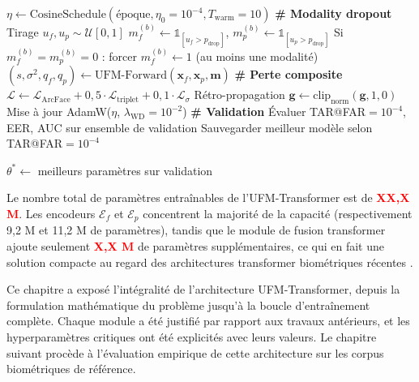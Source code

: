 \documentclass[12pt,a4paper]{report}
\newcommand{\TO}{\textbf{to}}
\begin{document}
\begin{algorithm}[htbp]
\begin{algorithmic}[1]
\FOR{$\text{\'{e}poque} = 1$ \TO $100$}
    \STATE $\eta \leftarrow \text{CosineSchedule}(\text{\'{e}poque}, \eta_0 = 10^{-4}, T_{\text{warm}} = 10)$
        \STATE \textbf{\# Modality dropout}
        \FOR{$b = 1$ \TO $B$}
            \STATE Tirage $u_f, u_p \sim \mathcal{U}[0,1]$
            \STATE $m_f^{(b)} \leftarrow \mathbb{1}_{[u_f > p_{\text{drop}}]}$, $m_p^{(b)} \leftarrow \mathbb{1}_{[u_p > p_{\text{drop}}]}$
            \STATE Si $m_f^{(b)} = m_p^{(b)} = 0$ : forcer $m_f^{(b)} \leftarrow 1$ (au moins une modalit\'{e})
        \ENDFOR
        \STATE $(s, \sigma^2, q_f, q_p) \leftarrow \text{UFM-Forward}(\mathbf{x}_f, \mathbf{x}_p, \mathbf{m})$
        \STATE \textbf{\# Perte composite}
        \STATE $\mathcal{L} \leftarrow \mathcal{L}_{\text{ArcFace}} + 0{,}5 \cdot \mathcal{L}_{\text{triplet}} + 0{,}1 \cdot \mathcal{L}_{\sigma}$
        \STATE R\'{e}tro-propagation
        \STATE $\mathbf{g} \leftarrow \text{clip}_{\text{norm}}(\mathbf{g}, 1{,}0)$
        \STATE Mise \`{a} jour AdamW($\eta$, $\lambda_{\text{WD}} = 10^{-2}$)
    \ENDFOR
    \STATE \textbf{\# Validation}
    \STATE \'{E}valuer TAR@FAR$=10^{-4}$, EER, AUC sur ensemble de validation
    \STATE Sauvegarder meilleur mod\`{e}le selon TAR@FAR$=10^{-4}$
\ENDFOR

\RETURN $\theta^* \leftarrow$ meilleurs param\`{e}tres sur validation
\end{algorithmic}
\end{algorithm}

Le nombre total de param\`{e}tres entra\^{i}nables de l'UFM-Transformer est de \textcolor{red}{\textbf{XX,X M}}. %
Les encodeurs $\mathcal{E}_f$ et $\mathcal{E}_p$ concentrent la majorit\'{e} de la capacit\'{e} (respectivement 9,2 M et 11,2 M de param\`{e}tres), tandis que le module de fusion transformer ajoute seulement \textcolor{red}{\textbf{X,X M}} de param\`{e}tres suppl\'{e}mentaires, ce qui en fait une solution compacte au regard des architectures transformer biom\'{e}triques r\'{e}centes \cite{grosz2024afrnet, talreja2021deephashing}.

Ce chapitre a expos\'{e} l'int\'{e}gralit\'{e} de l'architecture UFM-Transformer, depuis la formulation math\'{e}matique du probl\`{e}me jusqu'\`{a} la boucle d'entra\^{i}nement compl\`{e}te. Chaque module a \'{e}t\'{e} justifi\'{e} par rapport aux travaux ant\'{e}rieurs, et les hyperparam\`{e}tres critiques ont \'{e}t\'{e} explicit\'{e}s avec leurs valeurs. Le chapitre suivant proc\`{e}de \`{a} l'\'{e}valuation empirique de cette architecture sur les corpus biom\'{e}triques de r\'{e}f\'{e}rence.
\end{document}
